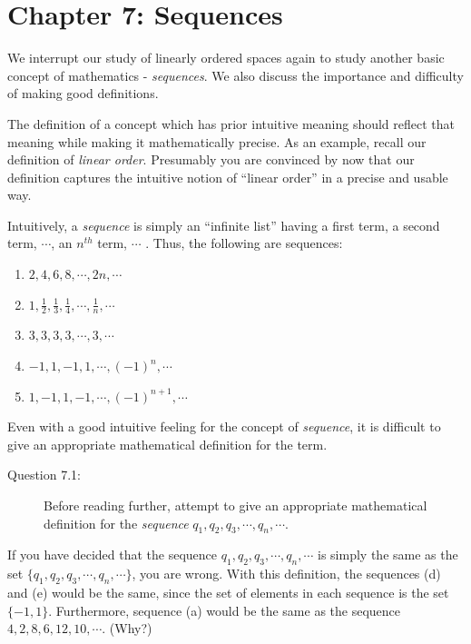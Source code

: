 \documentclass{book}
\begin{document}
\chapter*{Chapter 7: Sequences}


We interrupt our study of linearly ordered spaces again to study another basic concept of mathematics - \emph{sequences}. We also discuss the importance and difficulty of making good definitions.

The definition of a concept which has prior intuitive meaning should reflect that meaning while making it mathematically precise. As an example, recall our definition of \emph{linear order}. Presumably you are convinced by now that our definition captures the intuitive notion of ``linear order'' in a precise and usable way.

Intuitively, a \emph{sequence} is simply an ``infinite list'' having a first term, a second term, $\cdots$, an $n^{th}$ term, $\cdots$ . Thus, the following are sequences:
\begin{enumerate}[\hspace{1cm}(a)]
  \item $2, 4, 6, 8, \cdots, 2n, \cdots$
  \item $1, \frac{1}{2}, \frac{1}{3}, \frac{1}{4}, \cdots, \frac{1}{n}, \cdots$
  \item $3, 3, 3, 3, \cdots, 3, \cdots$
  \item $-1, 1, -1, 1, \cdots, (-1)^{n}, \cdots$
  \item $1, -1, 1, -1, \cdots, (-1)^{n+1}, \cdots$
\end{enumerate}
Even with a good intuitive feeling for the concept of \emph{sequence}, it is difficult to give an appropriate mathematical definition for the term.

\begin{description}

\item[Question 7.1:] Before reading further, attempt to give an appropriate mathematical definition for the \emph{sequence} $q_{1}, q_{2}, q_{3}, \cdots, q_{n}, \cdots$.

\end{description}

If you have decided that the sequence $q_{1}, q_{2}, q_{3}, \cdots, q_{n}, \cdots$ is simply the same as the set $\{ q_{1}, q_{2}, q_{3}, \cdots, q_{n}, \cdots \}$, you are wrong. With this definition, the sequences (d) and (e) would be the same, since the set of elements in each sequence is the set $\{ -1, 1 \}$. Furthermore, sequence (a) would be the same as the sequence $4, 2, 8, 6, 12, 10, \cdots$. (Why?)
\end{document}
